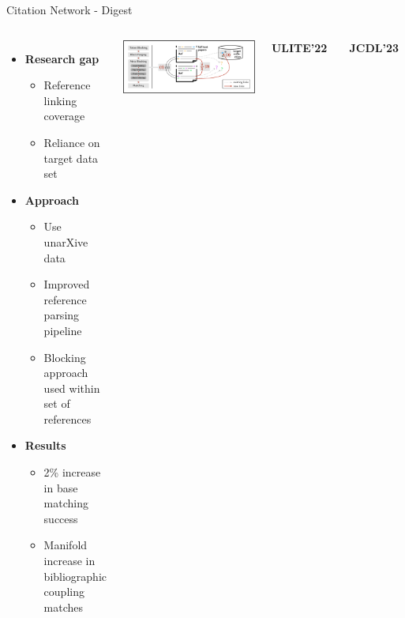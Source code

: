 \documentclass[en,16:9,smallfoot]{sdqbeamer}
\begin{document}
   \begin{frame}{Citation Network - Digest}

   \begin{columns}
        \begin{itemize}
            \item \textbf{Research gap}
            \begin{itemize}
                \item Reference linking coverage
                \item Reliance on target data set
            \end{itemize}
            \item \textbf{Approach}
            \begin{itemize}
                \item Use unarXive data
                \item Improved reference parsing pipeline
                \item Blocking approach used within set of references
            \end{itemize}
            \item \textbf{Results}
            \begin{itemize}
                \item 2\% increase in base matching success
                \item Manifold increase in bibliographic coupling matches
            \end{itemize}
        \end{itemize}
            \includegraphics[width=\linewidth]{imgs/blocking_schema}
           \begin{infobox-pub-small}
           \textbf{ULITE'22}~\cite{Saier2022ULITE}
           \end{infobox-pub-small}
           \vspace{-0.5em}
           \begin{infobox-pub-small}
           \textbf{JCDL'23}~\cite{Saier2023unarXive}
           \end{infobox-pub-small}
   \end{columns}
   \end{frame}
\end{document}
